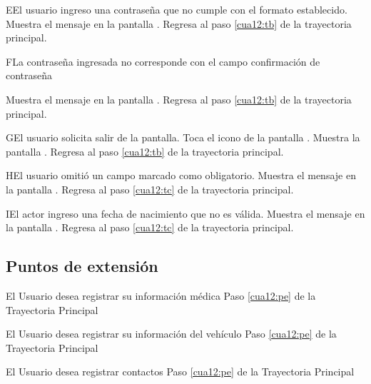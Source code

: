  \begin{UCtrayectoriaA}{E}{El usuario ingreso una contraseña que no cumple con el formato establecido.}
	\UCpaso[\UCsist] Muestra el mensaje  en la pantalla .
	\UCpaso[] Regresa al paso \ref{cua12:tb} de la trayectoria principal. 
\end{UCtrayectoriaA}

 \begin{UCtrayectoriaA}{F}{La contraseña ingresada no corresponde con el campo confirmación de contraseña}
	
	\UCpaso[\UCsist] Muestra el mensaje  en la pantalla .
	\UCpaso[] Regresa al paso \ref{cua12:tb} de la trayectoria principal.
	
\end{UCtrayectoriaA}

 \begin{UCtrayectoriaA}{G}{El usuario solicita salir de la pantalla.}
    \UCpaso[\UCactor] Toca el icono \btnRegresar de la pantalla .
	\UCpaso[\UCsist] Muestra la pantalla . 
	\UCpaso[] Regresa al paso \ref{cua12:tb} de la trayectoria principal.
 \end{UCtrayectoriaA}

 \begin{UCtrayectoriaA}{H}{El usuario omitió un campo marcado como obligatorio.}
 	\UCpaso[\UCsist] Muestra el mensaje  en la pantalla .
	\UCpaso[] Regresa al paso \ref{cua12:tc} de la trayectoria principal. 
\end{UCtrayectoriaA}

 \begin{UCtrayectoriaA}{I}{El actor ingreso una fecha de nacimiento que no es válida.}
 	\UCpaso[\UCsist] Muestra el mensaje  en la pantalla .
	\UCpaso[] Regresa al paso \ref{cua12:tc} de la trayectoria principal. 
\end{UCtrayectoriaA}


\subsection{Puntos de extensión}

\UCExtensionPoint
{El Usuario desea registrar su información médica}
{ Paso \ref{cua12:pe} de la Trayectoria Principal}
{}

\UCExtensionPoint
{El Usuario desea registrar su información del vehículo}
{ Paso \ref{cua12:pe} de la Trayectoria Principal}
{}

\UCExtensionPoint
{El Usuario desea registrar contactos}
{ Paso \ref{cua12:pe} de la Trayectoria Principal}
{}

